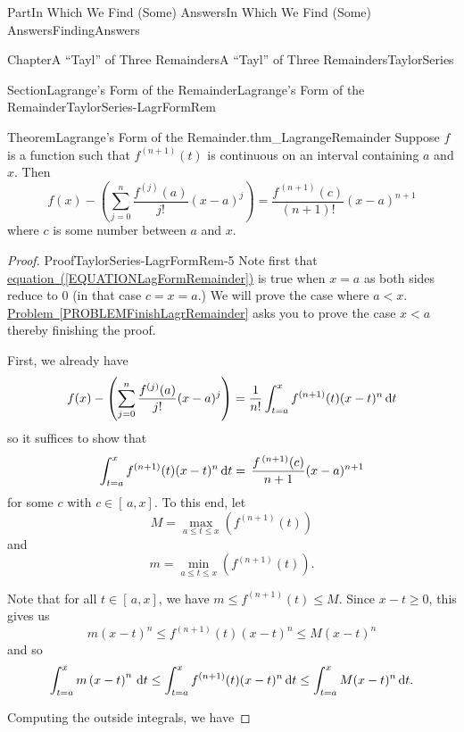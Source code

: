 \documentclass[oneside,10pt,]{book}
\newcommand{\xreffont}{\relax}
\numberwithin{equation}{part}
\newcommand{\dx}[1]{\,{\rm d}#1}
\newcommand{\lt}{<}
\begin{document}
\begin{partptx}{Part}{In Which We Find (Some) Answers}{}{In Which We Find (Some) Answers}{}{}{FindingAnswers}
\begin{chapterptx}{Chapter}{A ``Tayl'' of Three Remainders}{}{A ``Tayl'' of Three Remainders}{}{}{TaylorSeries}
\begin{sectionptx}{Section}{Lagrange's Form of the Remainder}{}{Lagrange's Form of the Remainder}{}{}{TaylorSeries-LagrFormRem}
\begin{theorem}{Theorem}{Lagrange's Form of the Remainder.}{}{thm_LagrangeRemainder}
%
%
Suppose \(f\) is a function such that \(f^{(n+1)}(t)\) is continuous on an interval containing \(a\) and \(x\). Then%
\begin{equation}
f(x)-\left(\sum_{j=0}^n\frac{f^{(j)}(a)}{j!}(x-a)^j\right)=\frac{f^{\, (n+1)}(c)}{(n+1)!}(x-a)^{n+1}\label{EQUATIONLagFormRemainder}
\end{equation}
where \(c\) is some number between \(a\) and \(x\).%
\end{theorem}
\begin{proof}{Proof}{}{TaylorSeries-LagrFormRem-5}
Note first that \hyperref[EQUATIONLagFormRemainder]{equation~({\xreffont\ref{EQUATIONLagFormRemainder}})} is true when \(x=a\) as both sides reduce to \(0\) (in that case \(c=x=a\).)  We will prove the case where \(a\lt x\). \hyperref[PROBLEMFinishLagrRemainder]{Problem~{\xreffont\ref{PROBLEMFinishLagrRemainder}}} asks you to prove the case \(x\lt a\) thereby finishing the proof.%
\par
First, we already have%
\begin{equation*}
f(x)-\left(\sum_{j=0}^n\frac{f^{(j)}(a)}{j!}(x-a)^j\right)=\frac{1}{n!} \int_{t=a}^xf^{(n+1)}(t)(x-t)^n\dx{ t}
\end{equation*}
so it suffices to show that%
\begin{equation*}
\int_{t=a}^xf^{(n+1)}(t)(x-t)^n\dx{ t}=\,\frac{f^{\,(n+1)}(c)}{n+1}(x-a)^{n+1}
\end{equation*}
for some \(c\) with \(c\in[\,a,x]\). To this end, let%
\begin{equation*}
M=\max_{a\le t\le x}\left(f^{(n+1)}(t)\right)
\end{equation*}
and%
\begin{equation*}
m=\min_{a\le t\le x}\left(f^{(n+1)}(t)\right)\text{.}
\end{equation*}
%
\par
Note that for all \(t\in[\,a,x]\), we have \(m\leq f^{(n+1)}(t)\leq M\). Since \(x-t\geq 0\), this gives us%
\begin{equation}
m\left(x-t\right)^n\leq f^{(n+1)}(t)(x-t)^n\leq M(x-t)^n\label{eq_LagRem1}
\end{equation}
and so%
\begin{equation}
\int_{t=a}^xm\left(x-t\right)^n\dx{ t}\leq\int_{t=a}^xf^{(n+1)}(t)(x-t)^n\dx{ t}\leq \int_{t=a}^xM(x-t)^n\dx{ t}\text{.}\label{eq_LagRem2}
\end{equation}
%
\par
Computing the outside integrals, we have%

\end{proof}
\end{sectionptx}
\end{chapterptx}
\end{partptx}
\end{document}
